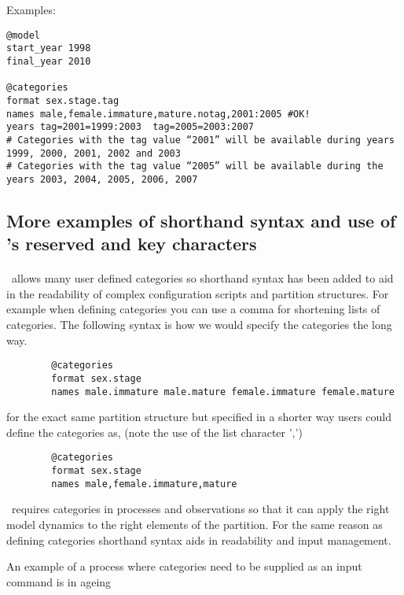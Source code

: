 Examples:

{\small{\begin{verbatim}
@model
start_year 1998
final_year 2010

@categories
format sex.stage.tag
names male,female.immature,mature.notag,2001:2005 #OK!
years tag=2001=1999:2003  tag=2005=2003:2007
# Categories with the tag value “2001” will be available during years 1999, 2000, 2001, 2002 and 2003
# Categories with the tag value “2005” will be available during the years 2003, 2004, 2005, 2006, 2007
\end{verbatim}}}

\subsection{More examples of shorthand syntax and use of \CNAME's reserved and key characters}\label{sec:ShorthandSyntax-section}

\paragraph*{\label{sub:categories}}

\CNAME\ allows many user defined categories so shorthand syntax has been added to aid in the readability of complex configuration scripts and partition structures. For example when defining categories you can use a comma for shortening lists of categories. The following syntax is how we would specify the categories the long way.

{\small{\begin{verbatim}
		@categories
		format sex.stage
		names male.immature male.mature female.immature female.mature
		\end{verbatim}}}

for the exact same partition structure but specified in a shorter way users could define the categories as, (note the use of the list character ',')

{\small{\begin{verbatim}
		@categories
		format sex.stage
		names male,female.immature,mature
		\end{verbatim}}}

\CNAME\ requires categories in processes and observations so that it can apply the right model dynamics to the right elements of the partition. For the same reason as defining categories shorthand syntax aids in readability and input management.

An example of a process where categories need to be supplied as an input command is in ageing

